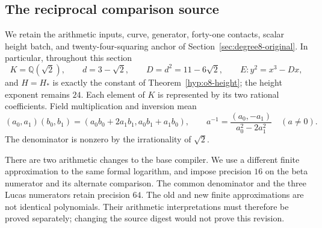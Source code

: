 \documentclass[11pt]{article}
\theoremstyle{definition}
\theoremstyle{remark}
\newcommand{\Q}{\mathbb Q}
\begin{document}
\subsection{The reciprocal comparison source}
\label{subsec:quartic-source}

We retain the arithmetic inputs, curve, generator, forty-one contacts,
scalar height batch, and twenty-four-squaring anchor of
Section~\ref{sec:degree8-original}. In particular, throughout this section
\[
 K=\Q(\sqrt2),\qquad d=3-\sqrt2,\qquad D=d^2=11-6\sqrt2,
 \qquad E:y^2=x^3-Dx,
\]
and $H=H_*$ is exactly the constant of Theorem~\ref{hyp:o8-height};
the height exponent remains $24$. Each element of $K$ is represented by
its two rational coefficients. Field multiplication and inversion mean
\[
 (a_0,a_1)(b_0,b_1)=(a_0b_0+2a_1b_1,a_0b_1+a_1b_0),\qquad
 a^{-1}=\frac{(a_0,-a_1)}{a_0^2-2a_1^2}\quad(a\ne0).
\]
The denominator is nonzero by the irrationality of $\sqrt2$.

There are two arithmetic changes to the base compiler. We use a different
finite approximation to the same formal logarithm, and impose precision
$16$ on the beta numerator and its alternate comparison. The common
denominator and the three Lucas numerators retain precision $64$.
The old and new finite approximations are not identical polynomials.
Their arithmetic interpretations must therefore be proved separately;
changing the source digest would not prove this revision.
\end{document}

